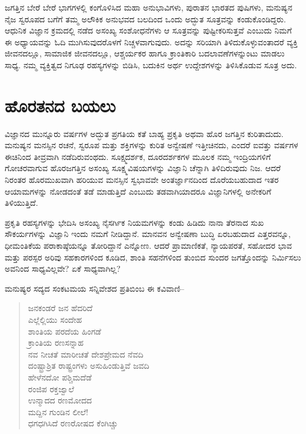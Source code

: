 ಜಗತ್ತಿನ ಬೇರೆ ಬೇರೆ ಭಾಗಗಳಲ್ಲಿ ಕಂಗೊಳಿಸಿದ ಮಹಾ ಅನುಭಾವಿಗಳು, ಪುರಾತನ ಭಾರತದ ಪುಷಿಗಳು, ಮನುಷ್ಯನ ನೈಜ ಸ್ವರೂಪದ ಬಗೆಗೆ ತಮ್ಮ ಅಲೌಕಿಕ ಅನುಭವದ ಬಲದಿಂದ ಒಂದು ಅದ್ಭುತ ಸೂತ್ರವನ್ನು ಕಂಡುಕೊಂಡಿದ್ದರು. ಆಧುನಿಕ ವಿಜ್ಞಾನ ಕ್ರಮದಲ್ಲಿ ನಡೆದ ಅಸಂಖ್ಯ ಸಂಶೋಧನೆಗಳು ಆ ಸೂತ್ರವನ್ನು ಪುಷ್ಟೀಕರಿಸುತ್ತವೆ ಎಂಬುದು ನಿಮಗೆ ಈ ಅಧ್ಯಾಯವನ್ನು ಓದಿ ಮುಗಿಸುವುದರೊಳಗೆ ನಿಚ್ಚಳವಾಗುವುದು. ಅದನ್ನು ಸರಿಯಾಗಿ ತಿಳಿದುಕೊಳ್ಳುವಂತಾದರೆ ವ್ಯಕ್ತಿ ಜೀವನದಲ್ಲೂ, ಸಾಮಾಜಿಕ ಜೀವನದಲ್ಲೂ, ಆಶ್ಚರ್ಯಕರ ಹಾಗೂ ಕ್ರಾಂತಿಕಾರಿ ಬದಲಾವಣೆ\-ಗಳನ್ನುಂಟು ಮಾಡಲು ಸಾಧ್ಯ. ನಮ್ಮ ವ್ಯಕ್ತಿತ್ವದ ನಿಗೂಢ ರಹಸ್ಯಗಳನ್ನು ಬಿಡಿಸಿ, ಬದುಕಿನ ಅರ್ಥ ಉದ್ದೇಶಗಳನ್ನು ತಿಳಿಸಿಕೊಡುವ ಸೂತ್ರ ಅದು.


\section*{ಹೊರತನದ ಬಯಲು}


ವಿಜ್ಞಾನದ ಮುನ್ನೂರು ವರ್ಷಗಳ ಅದ್ಭುತ ಪ್ರಗತಿಯ ಕತೆ ಬಾಹ್ಯ ಪ್ರಕೃತಿ ಅಥವಾ ಹೊರ ಜಗತ್ತಿನ ಕುರಿತಾದುದು. ಮನುಷ್ಯನ ಮನಸ್ಸಿನ ರಚನೆ, ಸ್ವರೂಪ ಮತ್ತು ಶಕ್ತಿಗಳನ್ನು ಕುರಿತ ಅನ್ವೇಷಣೆ ಇತ್ತೀಚಿನದು, ಎಂದರೆ ಐವತ್ತು ವರ್ಷಗಳ ಈಚಿನಿಂದ ತೀವ್ರವಾಗಿ ನಡೆದಿರುವಂಥದು. ಸೂಕ್ಷ್ಮದರ್ಶಕ, ದೂರದರ್ಶಕಗಳ ಮೂಲಕ ನಮ್ಮ ಇಂದ್ರಿಯಗಳಿಗೆ ಗೋಚರವಾಗುವ ಹೊರ\-ಜಗತ್ತಿನ ಅಸಂಖ್ಯ ಸೂಕ್ಷ್ಮವಿಷಯಗಳನ್ನು ವಿಜ್ಞಾನಿ ಚೆನ್ನಾಗಿ ತಿಳಿದಿರುವುದು ನಿಜ. ಆದರೆ ನಿರಂತರ ಹೊರಮುಖವಾಗಿ ಹರಿಯುವ ಮನಸ್ಸಿನ ಸ್ವಭಾವವೇ ಅಂತರ್ಜ್ಞಾನದಿಂದ ದೊರೆಯಬಹುದಾದ ಇತರ ಆಯಾಮಗಳನ್ನು ನೋಡದಂತೆ ತಡೆ ಮಾಡುತ್ತಿದೆ ಎಂಬುದು ತಡವಾಗಿಯಾದರೂ ವಿಜ್ಞಾನಿಗಳಲ್ಲಿ ಅನೇಕರಿಗೆ ತಿಳಿಯುತ್ತಿದೆ.

ಪ್ರಕೃತಿ ರಹಸ್ಯಗಳನ್ನು ಭೇದಿಸಿ ಅಸಂಖ್ಯ ನೈಸರ್ಗಿಕ ನಿಯಮಗಳನ್ನು ಕಂಡು ಹಿಡಿದು ನಾನಾ ತೆರನಾದ ಸುಖ ಸೌಕರ್ಯಗಳನ್ನು ವಿಜ್ಞಾನಿ ಇಂದು ನಮಗೆ ನೀಡಿದ್ದಾನೆ. ಮಾನವನ ಅನ್ವೇಷಣಾ ಬುದ್ಧಿ ಏರಬಹುದಾದ ಎತ್ತರವನ್ನೂ, ಧೀಮಂತಿಕೆಯ ಪರಾಕಾಷ್ಠೆಯನ್ನೂ ತೋರಿದ್ದಾನೆ ಎನ್ನೋಣ. ಆದರೆ ಪ್ರಾಮಾಣಿಕತೆ, ನ್ಯಾಯಪರತೆ, ಸಹೋದರ ಭಾವ ಮತ್ತು ಪರಸ್ಪರ ಅರಿವು ಸಹಕಾರಗಳಿಂದ ಕೂಡಿದ, ಶಾಂತಿ ಸಹನೆಗಳಿಂದ ತುಂಬಿದ ಸುಂದರ ಜಗತ್ತೊಂದನ್ನು ನಿರ್ಮಿಸಲು ಅವನಿಂದ ಸಾಧ್ಯವಿಲ್ಲವೇ? ಏಕೆ ಸಾಧ್ಯವಾಗಿಲ್ಲ?

ಮನುಷ್ಯರ ಸದ್ಯದ ಸಂಕಟಮಯ ಸನ್ನಿವೇಶದ ಪ್ರತಿಬಿಂಬ ಈ ಕವಿವಾಣಿ–

\begin{verse}
ಜನಕಂಡರೆ ಜನ ಹೆದರಿದೆ\\ಎಲ್ಲೆಲ್ಲಿಯು ಸಂದೇಹ\\ಶಾಂತಿಯ ಪರದೆಯ ಹಿಂಗಡೆ\\ಕ್ರಾಂತಿಯ ರಣಸನ್ನಾಹ\\ನವ ನೀಚತೆ ಮಾರೀಚತೆ ದೇಶಪ್ರೇಮದ ನೆವದಿ\\ದಂಷ್ಟ್ರಾಶ್ರಿತ ರಾಷ್ಟ್ರಂಗಳು ಅಸುಹಿಂಡುತ್ತಿವೆ ಜವದಿ\\ಹೇಳೆನದೋ ಪಶ್ಚಿಮದೆಡೆ\\ರಂಜಿಪ ರಕ್ತಜ್ವಾಲೆ\\ಉನ್ಮಾದದ ರಣಮೋದದ\\ಮದ್ದಿನ ಗುಂಡಿನ ಲೀಲೆ!\\ಧಗಧಗಿಸಿದೆ ರಣರೋಷದ ಕೆಂಗಿಚ್ಚು
\end{verse}

